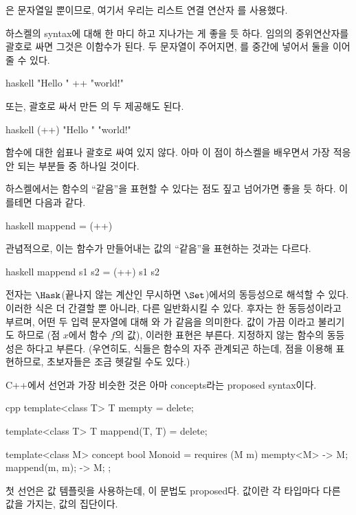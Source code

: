 은 문자열일 뿐이므로, 여기서 우리는 리스트 연결 연산자 \code{(++)}를 사용했다.

하스켈의 syntax에 대해 한 마디 하고 지나가는 게 좋을 듯 하다. 임의의 중위연산자를 괄호로 싸면 그것은 이\trArgument 함수가 된다.
두 문자열이 주어지면, \code{++}를 중간에 넣어서 둘을 이어줄 수 있다.

\begin{snip}{haskell}
"Hello " ++ "world!"
\end{snip}
또는, 괄호로 싸서 만든 \code{(++)}의 두  제공해도 된다.

\begin{snip}{haskell}
(++) "Hello " "world!"
\end{snip}
함수에 대한  쉽표나 괄호로 싸여 있지 않다.
아마 이 점이 하스켈을 배우면서 가장 적응 안 되는 부분들 중 하나일 것이다.

하스켈에서는 함수의 ``같음''을 표현할 수 있다는 점도 짚고 넘어가면 좋을 듯 하다. 이를테면 다음과 같다.

\begin{snip}{haskell}
mappend = (++)
\end{snip}
관념적으로, 이는 함수가 만들어내는 값의 ``같음''을 표현하는 것과는 다르다.

\begin{snip}{haskell}
mappend s1 s2 = (++) s1 s2
\end{snip}
전자는 \trCategory $\Hask$(끝나지 않는 계산인  무시하면 $\Set$)에서의  동등성으로 해석할 수 있다.
이러한 식은 더 간결할 뿐 아니라, 다른  일반화시킬 수 있다.
후자는 \newterm{\trExtensional}한 동등성이라고 부르며,
어떤 두 입력 문자열에 대해 와 \code{(++)}가 같음을 의미한다.
 값이 가끔 이라고 불리기도 하므로 (점 $x$에서 함수 $f$의 값), 이러한 표현은 
 부른다.
 지정하지 않는 함수의 동등성은 \newterm{\trPointFree}하다고 부른다.
(우연히도, \trPointFree 식들은 함수의  자주 관계되곤 하는데,  점을 이용해 표현하므로, 초보자들은 조금 헷갈릴 수도 있다.)

C++에서 \trMonoid 선언과 가장 비슷한 것은 아마 concepts라는 proposed syntax이다. %

\begin{snip}{cpp}
template<class T>
  T mempty = delete;
  
template<class T>
  T mappend(T, T) = delete;
  
template<class M> 
  concept bool Monoid = requires (M m) { 
    { mempty<M> } -> M; 
    { mappend(m, m); } -> M;
  };
\end{snip}
첫 선언은 값 템플릿을 사용하는데, 이 문법도 proposed다. 
\trPolymorphic 값이란 각 타입마다 다른 값을 가지는, 값의 집단이다.

